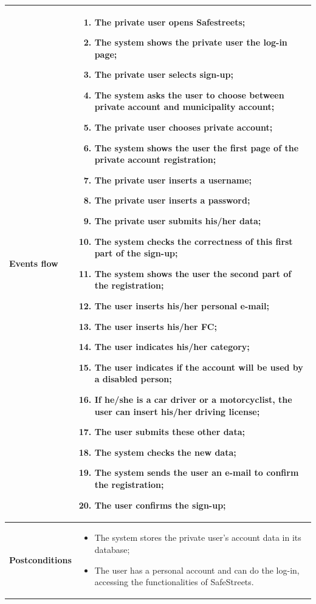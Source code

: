 \documentclass[titlepage]{article}
\begin{document}
\begin{longtable}{| p{3 cm} | p{10 cm} |}
\textbf{Events flow} & 
\begin{enumerate}
	\item The private user opens Safestreets;
	\item The system shows the private user the log-in page;
	\item The private user selects sign-up;
	\item The system asks the user to choose between private account and municipality account;
	\item The private user chooses private account;
	\item The system shows the user the first page of the private account registration;
	\item The private user inserts a username;
	\item The private user inserts a password;
	\item The private user submits his/her data;
	\item The system checks the correctness of this first part of the sign-up;
	\item The system shows the user the second part of the registration;
	\item The user inserts his/her personal e-mail;
	\item The user inserts his/her FC;
	\item The user indicates his/her category;
	\item The user indicates if the account will be used by a disabled person;
	\item If he/she is a car driver or a motorcyclist, the user can insert his/her driving license;
	\item The user submits these other data;
	\item The system checks the new data;
	\item The system sends the user an e-mail to confirm the registration;
	\item The user confirms the sign-up;
\end{enumerate} \\ \hline
\textbf{Postconditions} & 
\begin{itemize}
\item The system stores the private user's account data in its database;
\item The user has a personal account and can do the log-in, accessing the functionalities of SafeStreets.
\end{itemize} \\ \hline


\end{longtable}
\end{document}
